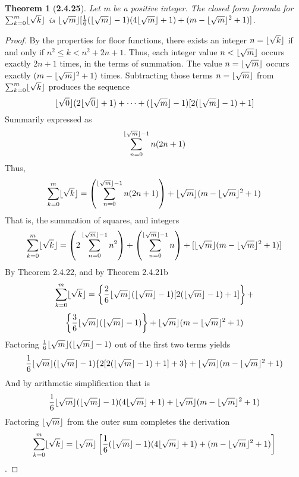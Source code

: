 \documentclass[a4paper, 12pt]{article}
\theoremstyle{plain}
\newtheorem*{theorem*}{Theorem}
\DeclarePairedDelimiter{\floor}{\lfloor}{\rfloor}
\begin{document}
	
\begin{theorem*}[\textbf{2.4.25}]
    Let m be a positive integer. The closed form formula for $\sum_{k=0}^{m} \floor{\sqrt{k}}$ 
    is $\floor{\sqrt{m}}[\frac{1}{6}(\floor{\sqrt{m}}-1)(4\floor{\sqrt{m}}+1) + 
    (m - \floor{\sqrt{m}}^{2} + 1)]$.
\end{theorem*}

\begin{proof}
    By the properties for floor functions, there exists an integer $n = \floor{\sqrt{k}}$ 
    if and only if $n^{2} \le k < n^{2} + 2n + 1$. Thus, each integer value 
    $n < \floor{\sqrt{m}}$ occurs exactly $2n + 1$ times, in the terms of summation. The value
    $n = \floor{\sqrt{m}}$ occurs exactly $(m - \floor{\sqrt{m}}^{2} + 1)$ times. Subtracting 
    those terms $n = \floor{\sqrt{m}}$ from $\sum_{k=0}^{m} \floor{\sqrt{k}}$ produces the 
    sequence $$\floor{\sqrt{0}}(2\floor{\sqrt{0}} + 1) + \dots + 
    (\floor{\sqrt{m}}-1)[2(\floor{\sqrt{m}}-1) + 1]$$
    Summarily expressed as $$\sum_{n=0}^{\floor{\sqrt{m}}-1} n(2n + 1)$$ Thus,
    $$\sum_{k=0}^{m} \floor{\sqrt{k}} = 
    \left(\sum_{n=0}^{\floor{\sqrt{m}}-1} n(2n + 1)\right) + 
    \floor{\sqrt{m}}(m - \floor{\sqrt{m}}^{2} + 1)$$
    That is, the summation of squares, and integers
    $$\sum_{k=0}^{m} \floor{\sqrt{k}} = 
    \left(2\sum_{n=0}^{\floor{\sqrt{m}}-1} n^{2}\right) + 
    \left(\sum_{n=0}^{\floor{\sqrt{m}}-1} n\right) + 
    [\floor{\sqrt{m}}(m - \floor{\sqrt{m}}^{2} + 1)]$$
    By Theorem 2.4.22, and by Theorem 2.4.21b
    $$\sum_{k=0}^{m} \floor{\sqrt{k}} = 
    \left\{\frac{2}{6}\floor{\sqrt{m}}(\floor{\sqrt{m}}-1)[2(\floor{\sqrt{m}}-1)+1]\right\}+$$
    $$\left\{\frac{3}{6}\floor{\sqrt{m}}(\floor{\sqrt{m}}-1)\right\} + \floor{\sqrt{m}}(m - 
    \floor{\sqrt{m}}^{2} + 1)$$
    Factoring $\frac{1}{6}\floor{\sqrt{m}}(\floor{\sqrt{m}}-1)$ out of the first two terms 
    yields 
    $$\frac{1}{6}\floor{\sqrt{m}}(\floor{\sqrt{m}}-1)\{2[2(\floor{\sqrt{m}}-1)+1] +3\}+
    \floor{\sqrt{m}}(m - \floor{\sqrt{m}}^{2} + 1)$$
    And by arithmetic simplification that is
    $$\frac{1}{6}\floor{\sqrt{m}}(\floor{\sqrt{m}}-1)(4\floor{\sqrt{m}} + 1) + 
    \floor{\sqrt{m}}(m - \floor{\sqrt{m}}^{2} + 1)$$
    Factoring $\floor{\sqrt{m}}$ from the outer sum completes the derivation
    $$\sum_{k=0}^{m} \floor{\sqrt{k}} = 
    \floor{\sqrt{m}}\left[\frac{1}{6}(\floor{\sqrt{m}}-1)(4\floor{\sqrt{m}}+1) + 
    (m - \floor{\sqrt{m}}^{2} + 1)\right]$$.
\end{proof}
\end{document}
